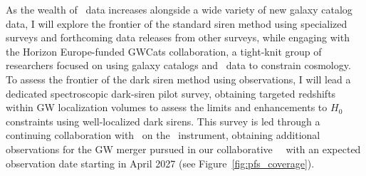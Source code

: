 As the wealth of \GW\ data increases alongside a wide variety of new galaxy catalog data, I will explore the frontier of the standard siren method using specialized surveys and forthcoming data releases from other surveys,
while engaging with the Horizon Europe-funded GWCats collaboration, a tight-knit group of researchers focused on using galaxy catalogs and \GW\ data to constrain cosmology.
To assess the frontier of the dark siren method using observations, I will lead a dedicated spectroscopic dark-siren pilot survey, obtaining targeted redshifts within GW localization volumes to assess the limits and enhancements to $H_0$ constraints using well-localized dark sirens. This survey is led through a continuing collaboration with \JGEM\ on the \PFS\ instrument, obtaining additional observations for the GW merger pursued in our collaborative \DESGW\ \ToO\, with an expected observation date starting in April 2027 (see Figure~\ref{fig:pfs_coverage}).


